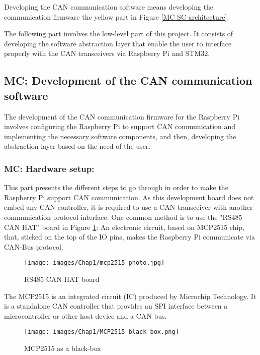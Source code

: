 \begin{sloppypar}
Developing the CAN communication software means developing the communication firmware the yellow part in Figure \ref{MC SC architecture}.
\end{sloppypar}

The following part involves the low-level part of this project. It consists of developing the software abstraction layer that enable the user to interface properly with the CAN transceivers via Raspberry Pi and STM32.

\subsection{MC: Development of the CAN communication software}
The development of the CAN communication firmware for the Raspberry Pi involves configuring the Raspberry Pi to support CAN communication and implementing the necessary software components, and then, developing the abstraction layer based on the need of the user.
\subsubsection{MC: Hardware setup:}
This part presents the different steps to go through in order to make the Raspberry Pi support CAN communication. As this development board does not embed any CAN controller, it is required to use a CAN transceiver with another communication protocol interface. One common method is to use the "RS485 CAN HAT" board in Figure \ref{mcp2515 module}: An electronic circuit, based on MCP2515 chip, that, sticked on the top of the IO pins, makes the Raspberry Pi communicate via CAN-Bus protocol. \cite{R19}

\begin{figure}[H]
\begin{center}
\texttt{[image: images/Chap1/mcp2515 photo.jpg]}\\
\caption{RS485 CAN HAT board}
\label{mcp2515 module}
\end{center}
\end{figure}

The MCP2515 is an integrated circuit (IC) produced by Microchip Technology. It is a standalone CAN controller that provides an SPI interface between a microcontroller or other host device and a CAN bus. \cite{R20}

\begin{figure}[H]
\begin{center}
\texttt{[image: images/Chap1/MCP2515 black box.png]}\\
\caption{MCP2515 as a black-box}
\label{mcp2515 blackbox}
\end{center}
\end{figure} 

